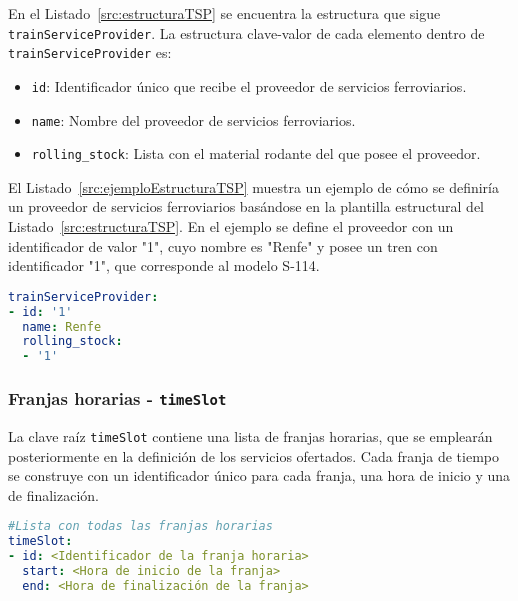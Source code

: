 En el Listado~\ref{src:estructuraTSP} se encuentra la estructura que sigue \texttt{trainServiceProvider}. La estructura clave-valor de cada elemento dentro de \texttt{trainServiceProvider} es:

\begin{itemize}
    \item \texttt{id}: Identificador único que recibe el proveedor de servicios ferroviarios.
    \item \texttt{name}: Nombre del proveedor de servicios ferroviarios.
    \item \texttt{rolling\_stock}: Lista con el material rodante del que posee el proveedor.
\end{itemize}

El Listado~\ref{src:ejemploEstructuraTSP} muestra un ejemplo de cómo se definiría un proveedor de servicios ferroviarios basándose en la plantilla estructural del Listado~\ref{src:estructuraTSP}. En el ejemplo se define el proveedor con un identificador de valor "1", cuyo nombre es "Renfe" y posee un tren con identificador "1", que corresponde al modelo S-114.

\begin{lstlisting}[language=YAML,
                   frame=none,
                   numbers=none,
                   basicstyle=\ttfamily\normalsize,
                   caption={Ejemplo con datos reales de la estructura de \texttt{trainServiceProvider}},
                   label=src:ejemploEstructuraTSP,
                   inputencoding=utf8]
trainServiceProvider:
- id: '1'
  name: Renfe
  rolling_stock:
  - '1'
\end{lstlisting}

\subsubsection{Franjas horarias -  \texttt{timeSlot}}

La clave raíz \texttt{timeSlot} contiene una lista de franjas horarias, que se emplearán posteriormente en la definición de los servicios ofertados. Cada franja de tiempo se construye con un identificador único para cada franja, una hora de inicio y una de finalización. 

\begin{lstlisting}[language=YAML,
                   frame=none,
                   numbers=none,
                   basicstyle=\ttfamily\normalsize,
                   caption={Estructura de la clave raíz \texttt{timeSlot}},
                   label=src:estructuraTimeSlot,
                   inputencoding=utf8]
#Lista con todas las franjas horarias
timeSlot:
- id: <Identificador de la franja horaria>
  start: <Hora de inicio de la franja>
  end: <Hora de finalización de la franja>
\end{lstlisting}

